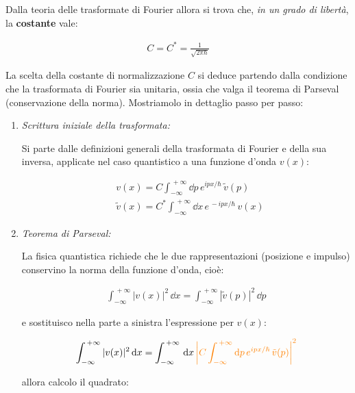 \begin{mydef}
	Dalla teoria delle trasformate di Fourier allora si trova che, \textit{in un grado di libertà}, la \textbf{costante} vale: 
	
\begin{align*}
	C = C^* = \frac{1}{\sqrt{2\pi\hbar}}
\end{align*}
\end{mydef}

\begin{myprf}
	La scelta della costante di normalizzazione $C$ si deduce partendo dalla condizione che la trasformata di Fourier sia unitaria, ossia che valga il teorema di Parseval (conservazione della norma). Mostriamolo in dettaglio passo per passo:
\begin{enumerate}[label=\arabic*)]
	\item \textit{Scrittura iniziale della trasformata:}
	
		Si parte dalle definizioni generali della trasformata di Fourier e della sua inversa, applicate nel caso quantistico a una funzione d'onda $v(x)$:
	
	\begin{align*}
	& v(x) = C \int_{-\infty}^{\, +\infty} \dd p  \, e^{ipx/\hbar} \, \tilde{v}(p) \\
	& \tilde{v}(x) = C^* \int_{-\infty}^{\, +\infty} \dd x  \, e^{\, -ipx/\hbar} \, v(x)
\end{align*}
	
	\item \textit{Teorema di Parseval:}
	
		La fisica quantistica richiede che le due rappresentazioni (posizione e impulso) conservino la norma della funzione d'onda, cioè:
	
	\begin{align*}
		\int_{-\infty}^{\, +\infty} |v(x)|^2 \, \dd x = \int_{-\infty}^{\, +\infty} |\tilde{v}(p)|^2 \, \dd p
	\end{align*}
	
		e sostituisco nella parte a sinistra l'espressione per $v(x)$:
		
	\begin{align*}
		\int_{-\infty}^{\, +\infty} |v(x)|^2 \, \dd x = \int_{-\infty}^{\, +\infty} \, \dd x \, \textcolor{orange}{\abs{C \int_{-\infty}^{\, +\infty} \dd p  \, e^{ipx/\hbar} \, \tilde{v}(p) }^2}
	\end{align*}
		
		allora calcolo il quadrato:
		

\end{enumerate}
\end{myprf}

